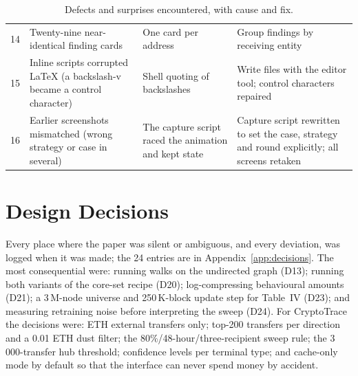 \begin{table}[H]
\begin{tabular}{r p{3.9cm} p{4.0cm} p{3.9cm}}
14 & Twenty-nine near-identical finding cards & One card per address & Group findings by receiving entity\\
15 & Inline scripts corrupted LaTeX (a backslash-v became a control character) & Shell quoting of backslashes & Write files with the editor tool; control characters repaired\\
16 & Earlier screenshots mismatched (wrong strategy or case in several) & The capture script raced the animation and kept state & Capture script rewritten to set the case, strategy and round explicitly; all screens retaken\\
\bottomrule
\end{tabular}
\caption{Defects and surprises encountered, with cause and fix.}
\label{tab:bugs}
\end{table}

\section{Design Decisions}
Every place where the paper was silent or ambiguous, and every deviation, was logged when it was made; the 24 entries are in Appendix~\ref{app:decisions}. The most consequential were: running walks on the undirected graph (D13); running both variants of the core-set recipe (D20); log-compressing behavioural amounts (D21); a 3\,M-node universe and 250\,K-block update step for Table~IV (D23); and measuring retraining noise before interpreting the sweep (D24). For CryptoTrace the decisions were: ETH external transfers only; top-200 transfers per direction and a 0.01 ETH dust filter; the 80\%/48-hour/three-recipient sweep rule; the 3\,000-transfer hub threshold; confidence levels per terminal type; and cache-only mode by default so that the interface can never spend money by accident.
